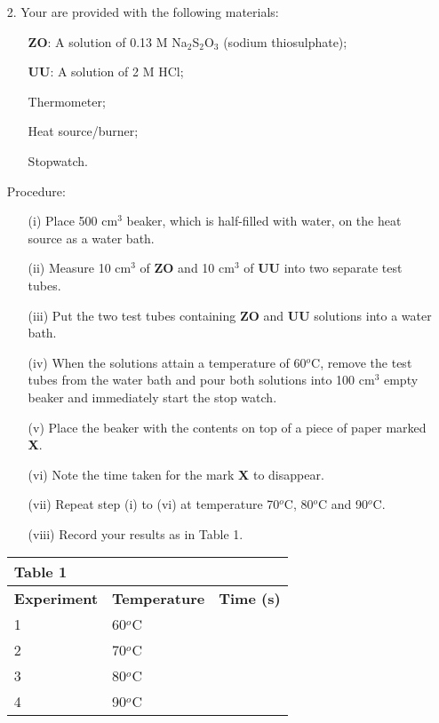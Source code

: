 \begin{enumerate}
\item[2.] Your are provided with the following materials:\\
\begin{enumerate}
\item[ ] \textbf{ZO}:  A solution of 0.13 M Na$_2$S$_2$O$_3$ (sodium thiosulphate);
\item[ ] \textbf{UU}:  A solution of 2 M HCl;
\item[ ] Thermometer;
\item[ ] Heat source/burner;
\item[ ] Stopwatch.\\
\end{enumerate}

Procedure:\\
\begin{enumerate}
\item[(i)] Place 500 cm$^3$ beaker, which is half-filled with water, on the heat source as a water bath.
\item[(ii)] Measure 10 cm$^3$ of \textbf{ZO} and 10 cm$^3$ of \textbf{UU} into two separate test tubes.
\item[(iii)] Put the two test tubes containing \textbf{ZO} and \textbf{UU} solutions into a water bath.
\item[(iv)] When the solutions attain a temperature of 60$^o$C, remove the test tubes from the water bath and pour both solutions into 100 cm$^3$ empty beaker and immediately start the stop watch.
\item[(v)] Place the beaker with the contents on top of a piece of paper marked \textbf{X}.
\item[(vi)] Note the time taken for the mark \textbf{X} to disappear.
\item[(vii)] Repeat step (i) to (vi) at temperature 70$^o$C, 80$^o$C and 90$^o$C.
\item[(viii)] Record your results as in Table 1.
\end{enumerate}

\newpage

\begin{center}
\begin{tabular}{|p{5cm}|p{5cm}|p{3cm}|}
\multicolumn{1}{l}{Table 1}&\multicolumn{1}{l}{ }&\multicolumn{1}{l}{ }\\ \hline
\textbf{Experiment}&\textbf{Temperature}&\textbf{Time (s)}\\ \hline
1&60$^o$C&\\ \hline
2&70$^o$C&\\ \hline
3&80$^o$C&\\ \hline
4&90$^o$C&\\ \hline
\end{tabular}
\end{center}


\end{enumerate}
